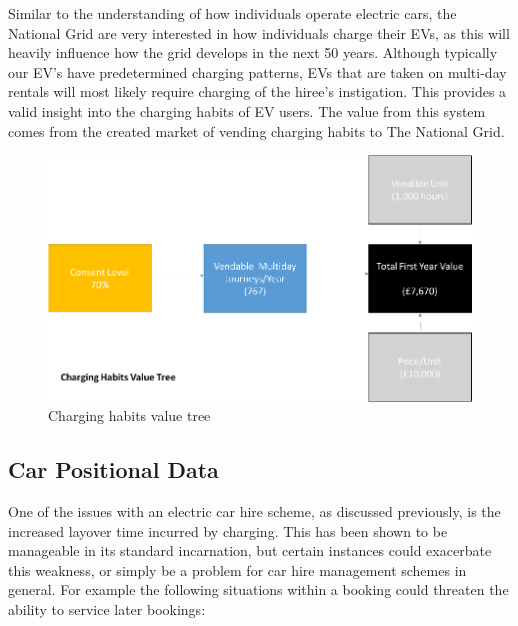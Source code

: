 \documentclass[conference]{IEEEtran}
\begin{document}
Similar to the understanding of how individuals operate electric cars,
the National Grid are very interested in how individuals charge their
EVs, as this will heavily influence how the grid develops in the next
50 years.  Although typically our EV’s have predetermined charging
patterns, EVs that are taken on multi-day rentals will most likely
require charging of the hiree’s instigation. This provides a valid
insight into the charging habits of EV users.  The value from this
system comes from the created market of vending charging habits to The
National Grid.

\begin{figure}[!htp]
\centering
\includegraphics[width=\columnwidth]{images/charginghabitsvt.png}
\caption{Charging habits value tree}
\label{fig:charginghabitsvt}
\end{figure}


\subsection{Car Positional Data}

One of the issues with an electric car hire scheme, as discussed
previously, is the increased layover time incurred by charging. This
has been shown to be manageable in its standard incarnation, but
certain instances could exacerbate this weakness, or simply be a
problem for car hire management schemes in general. For example the
following situations within a booking could threaten the ability to
service later bookings:
\end{document}
